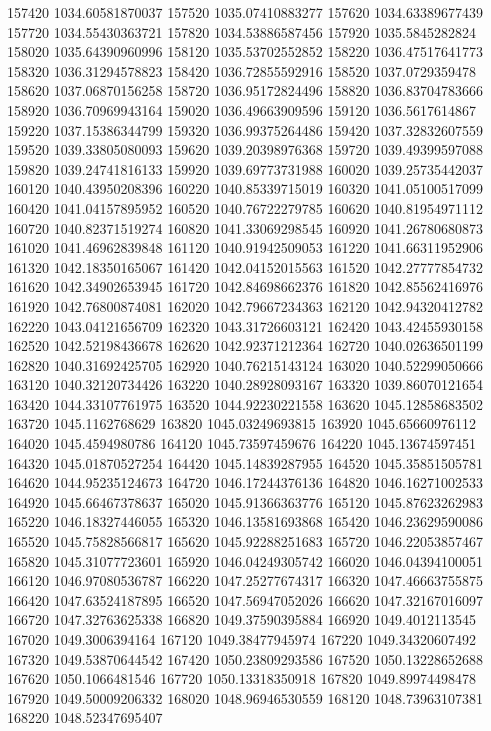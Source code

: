{157420 1034.60581870037
157520 1035.07410883277
157620 1034.63389677439
157720 1034.55430363721
157820 1034.53886587456
157920 1035.5845282824
158020 1035.64390960996
158120 1035.53702552852
158220 1036.47517641773
158320 1036.31294578823
158420 1036.72855592916
158520 1037.0729359478
158620 1037.06870156258
158720 1036.95172824496
158820 1036.83704783666
158920 1036.70969943164
159020 1036.49663909596
159120 1036.5617614867
159220 1037.15386344799
159320 1036.99375264486
159420 1037.32832607559
159520 1039.33805080093
159620 1039.20398976368
159720 1039.49399597088
159820 1039.24741816133
159920 1039.69773731988
160020 1039.25735442037
160120 1040.43950208396
160220 1040.85339715019
160320 1041.05100517099
160420 1041.04157895952
160520 1040.76722279785
160620 1040.81954971112
160720 1040.82371519274
160820 1041.33069298545
160920 1041.26780680873
161020 1041.46962839848
161120 1040.91942509053
161220 1041.66311952906
161320 1042.18350165067
161420 1042.04152015563
161520 1042.27777854732
161620 1042.34902653945
161720 1042.84698662376
161820 1042.85562416976
161920 1042.76800874081
162020 1042.79667234363
162120 1042.94320412782
162220 1043.04121656709
162320 1043.31726603121
162420 1043.42455930158
162520 1042.52198436678
162620 1042.92371212364
162720 1040.02636501199
162820 1040.31692425705
162920 1040.76215143124
163020 1040.52299050666
163120 1040.32120734426
163220 1040.28928093167
163320 1039.86070121654
163420 1044.33107761975
163520 1044.92230221558
163620 1045.12858683502
163720 1045.1162768629
163820 1045.03249693815
163920 1045.65660976112
164020 1045.4594980786
164120 1045.73597459676
164220 1045.13674597451
164320 1045.01870527254
164420 1045.14839287955
164520 1045.35851505781
164620 1044.95235124673
164720 1046.17244376136
164820 1046.16271002533
164920 1045.66467378637
165020 1045.91366363776
165120 1045.87623262983
165220 1046.18327446055
165320 1046.13581693868
165420 1046.23629590086
165520 1045.75828566817
165620 1045.92288251683
165720 1046.22053857467
165820 1045.31077723601
165920 1046.04249305742
166020 1046.04394100051
166120 1046.97080536787
166220 1047.25277674317
166320 1047.46663755875
166420 1047.63524187895
166520 1047.56947052026
166620 1047.32167016097
166720 1047.32763625338
166820 1049.37590395884
166920 1049.4012113545
167020 1049.3006394164
167120 1049.38477945974
167220 1049.34320607492
167320 1049.53870644542
167420 1050.23809293586
167520 1050.13228652688
167620 1050.1066481546
167720 1050.13318350918
167820 1049.89974498478
167920 1049.50009206332
168020 1048.96946530559
168120 1048.73963107381
168220 1048.52347695407
}
